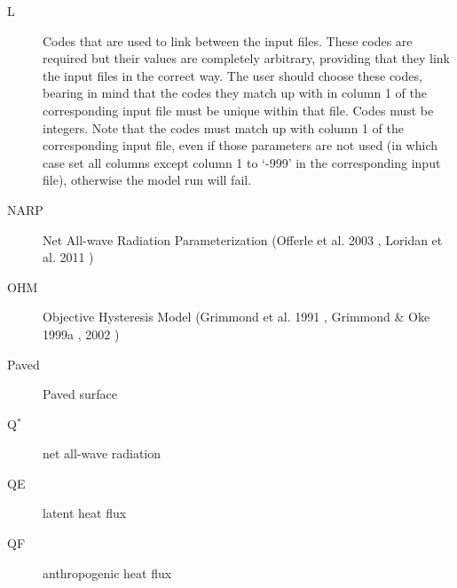 \documentclass[letterpaper,10pt,english]{sphinxmanual}
\begin{document}
\begin{description}
\item[{L}] \leavevmode{}\label{\detokenize{notation:term-19}}
Codes that are used to link between the input files. These codes are required but their values are completely arbitrary, providing that they link the input files in the correct way. The user should choose these codes, bearing in mind that the codes they match up with in column 1 of the corresponding input file must be unique within that file. Codes must be integers. Note that the codes must match up with column 1 of the corresponding input file, even if those parameters are not used (in which case set all columns except column 1 to ‘-999’ in the corresponding input file), otherwise the model run will fail.

\item[{NARP}] \leavevmode{}\label{\detokenize{notation:term-narp}}
Net All-wave  Radiation   Parameterization (Offerle et al. 2003 \label{\detokenize{notation:id3}}{\hyperref[\detokenize{references:o2003}]{\sphinxcrossref{{[}O2003{]}}}}, Loridan et al. 2011 \label{\detokenize{notation:id4}}{\hyperref[\detokenize{references:l2011}]{\sphinxcrossref{{[}L2011{]}}}})

\item[{OHM}] \leavevmode{}\label{\detokenize{notation:term-ohm}}
Objective Hysteresis Model (Grimmond et al. 1991 \label{\detokenize{notation:id5}}{\hyperref[\detokenize{references:g91ohm}]{\sphinxcrossref{{[}G91OHM{]}}}}, Grimmond \& Oke 1999a \label{\detokenize{notation:id6}}{\hyperref[\detokenize{references:go99qs}]{\sphinxcrossref{{[}GO99QS{]}}}}, 2002 \label{\detokenize{notation:id7}}{\hyperref[\detokenize{references:go2002}]{\sphinxcrossref{{[}GO2002{]}}}})

\item[{Paved}] \leavevmode{}\label{\detokenize{notation:term-paved}}
Paved surface

\item[{Q$^{\text{*}}$}] \leavevmode{}\label{\detokenize{notation:term-qstar}}
net all-wave radiation

\item[{QE}] \leavevmode{}\label{\detokenize{notation:term-qe}}
latent heat flux

\item[{QF}] \leavevmode{}\label{\detokenize{notation:term-qf}}
anthropogenic  heat flux


\end{description}
\end{document}
